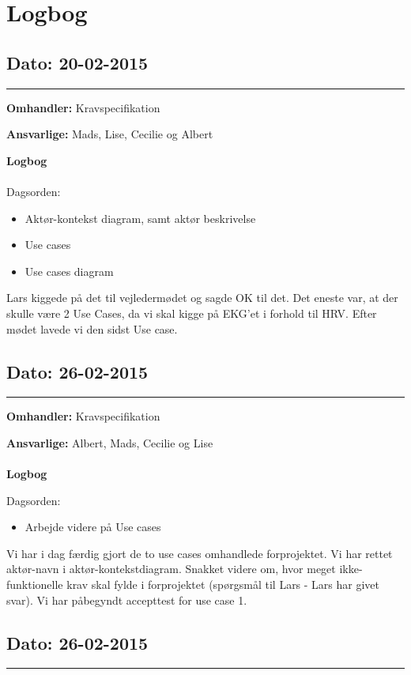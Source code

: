 \chapter{Logbog}

\section{Dato: 20-02-2015}
\hrule

\textbf{Omhandler:} Kravspecifikation

\textbf{Ansvarlige:} Mads, Lise, Cecilie og Albert

\textbf{Logbog}
\\
\\
Dagsorden:
\begin{itemize}
	\item Aktør-kontekst diagram, samt aktør beskrivelse
	\item Use cases
	\item Use cases diagram
\end{itemize}

Lars kiggede på det til vejledermødet og sagde OK til det. Det eneste var, at der skulle være 2 Use Cases, da vi skal kigge på EKG’et i forhold til HRV. Efter mødet lavede vi den sidst Use case. 

\section{Dato: 26-02-2015}
\hrule

\textbf{Omhandler:} Kravspecifikation

\textbf{Ansvarlige:} Albert, Mads, Cecilie og Lise\\ 
\\
\textbf{Logbog}

Dagsorden:
\begin{itemize}
	\item Arbejde videre på Use cases
\end{itemize}


Vi har i dag færdig gjort de to use cases omhandlede forprojektet. Vi har rettet aktør-navn i aktør-kontekstdiagram. 
Snakket videre om, hvor meget ikke-funktionelle krav skal fylde i forprojektet (spørgsmål til Lars - Lars har givet svar).
Vi har påbegyndt accepttest for use case 1.

\section{Dato: 26-02-2015}
\hrule 

